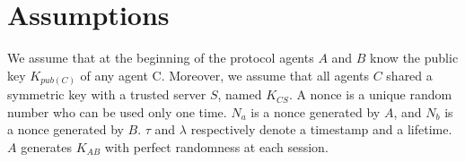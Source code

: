 \section{Assumptions}


We assume that at the beginning of the protocol agents $A$ and $B$ know the public key $K_{pub(C)}$ of any agent C.
Moreover, we assume that all agents $C$ shared a symmetric key with a trusted server $S$, named $K_{CS}$. A nonce is a unique random number who can be used only one time. $N_a$
is a nonce generated by $A$, and $N_b$ is a nonce generated by $B$. $\tau$ and $\lambda$ respectively denote a timestamp
and a lifetime. $A$ generates $K_{AB}$ with perfect randomness at each session.


